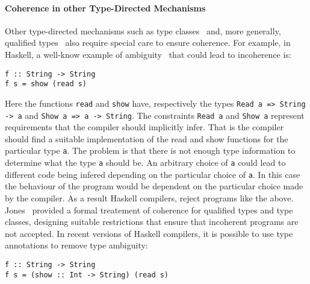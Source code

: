 \begin{comment}
As an alternative to syntactic subtyping described in this paper,
Frisch~\textit{et al.}~\cite{frisch2008semantic} studied semantic subtyping. Semantic
subtyping attempts to increase the expressive power of the 

seems to have important advantages over syntactic subtyping. One
worthy avenue for future work is to study languages with intersection types
and merge operator in a semantic subtyping setting.
\end{comment}

\paragraph{Coherence in other Type-Directed Mechanisms} Other
type-directed mechanisms such as type classes~\cite{Wadler89ad-hoc} and, more generally, 
qualified types~\cite{jones94} also require special care to ensure coherence.
For example, in Haskell, a well-know example of ambiguity~\cite{Mark93coherence} that could
lead to incoherence is:

\begin{verbatim}
f :: String -> String
f s = show (read s)
\end{verbatim}

\noindent Here the functions \verb|read| and \verb|show| have,
respectively the types \verb|Read a => String -> a| and 
\verb|Show a => a -> String|. The constraints \verb|Read a| 
and \verb|Show a| represent requirements that the compiler 
should implicitly infer. That is the compiler should find a suitable 
implementation of the read and show functions for the particular type 
\verb|a|. The problem is that there is not enough type information 
to determine what the type \verb|a| should be. 
An arbitrary choice 
of \verb|a| could lead to different code being infered depending on
the particular choice of \verb|a|. In this case the behaviour of the program would be dependent on the particular
choice made by the compiler. As a result Haskell compilers, reject 
programs like the above. Jones~\cite{Mark93coherence} provided a
formal treatement of coherence for qualified types and type classes,
designing suitable restrictions that ensure that incoherent programs 
are not accepted. In recent versions of Haskell compilers, it is possible to use 
type annotations to remove type ambiguity:

\begin{verbatim}
f :: String -> String
f s = (show :: Int -> String) (read s)
\end{verbatim}

